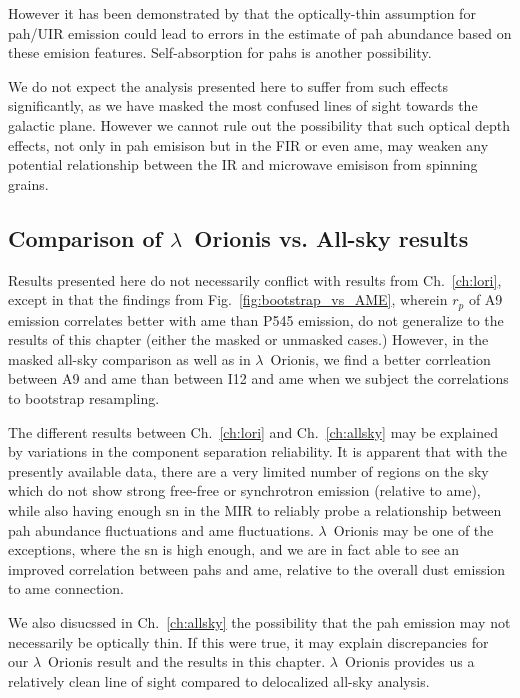               However it has been demonstrated by \cite{sakon04} that the optically-thin assumption for \acrshort{pah}/UIR emission could lead to errors in the estimate of \acrshort{pah} abundance based on these emision features. Self-absorption for \acrshort{pah}s is another possibility.

              We do not expect the analysis presented here to suffer from such effects significantly, as we have masked the most confused lines of sight towards the galactic plane. However we cannot rule out the possibility that such optical depth effects, not only in \acrshort{pah} emisison but in the FIR or even \acrshort{ame}, may weaken any potential relationship between the IR and microwave emisison from spinning grains.

            \subsection{Comparison of $\lambda$~Orionis vs. All-sky results}
              Results presented here do not necessarily conflict with results from Ch.~\ref{ch:lori}, except in that the findings from Fig.~\ref{fig:bootstrap_vs_AME}, wherein $r_{p}$ of A9 emission correlates better with \acrshort{ame} than P545 emission, do not generalize to the results of this chapter (either the masked or unmasked cases.) However, in the masked all-sky comparison as well as in $\lambda$~Orionis, we find a better corrleation between A9 and \acrshort{ame} than between I12 and \acrshort{ame} when we subject the correlations to bootstrap resampling.

               The different results between Ch.~\ref{ch:lori} and Ch.~\ref{ch:allsky} may be explained by variations in the component separation reliability. It is apparent that with the presently available data, there are a very limited number of regions on the sky which do not show strong free-free or synchrotron emission (relative to \acrshort{ame}), while also having enough \acrshort{sn} in the MIR to reliably probe a relationship between \acrshort{pah} abundance fluctuations and \acrshort{ame} fluctuations. $\lambda$~Orionis may be one of the exceptions, where the \acrshort{sn} is high enough, and we are in fact able to see an improved correlation between \acrshort{pah}s and \acrshort{ame}, relative to the overall dust emission to \acrshort{ame} connection.

              We also disucssed in Ch.~\ref{ch:allsky} the possibility that the \acrshort{pah} emission may not necessarily be optically thin. If this were true, it may explain discrepancies for our $\lambda$~Orionis result and the results in this chapter. $\lambda$~Orionis provides us a relatively clean line of sight compared to delocalized all-sky analysis.

